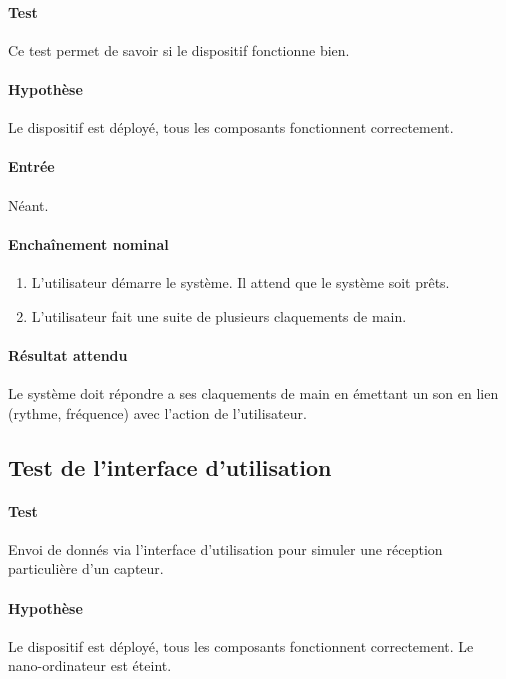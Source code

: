 \documentclass[a4paper, titlepage, oneside, 12pt]{article}%
\begin{document}
\paragraph{Test\\}
Ce test permet de savoir si le dispositif fonctionne bien.

\paragraph{Hypothèse\\}
Le dispositif est déployé, tous les composants fonctionnent correctement.

\paragraph{Entrée\\}
Néant.

\paragraph{Enchaînement nominal}
\begin {enumerate}
\item L'utilisateur démarre le système. Il attend que le système soit prêts.
\item L'utilisateur fait une suite de plusieurs claquements de main.
\end{enumerate}

\paragraph{Résultat attendu\\}
Le système doit répondre a ses claquements de main en émettant un son en lien (rythme, fréquence) avec l'action de l'utilisateur.

\subsection{Test de l'interface d'utilisation}
\paragraph{Test\\}
Envoi de donnés via l'interface d'utilisation pour simuler une réception particulière d'un capteur.

\paragraph{Hypothèse\\}
Le dispositif est déployé, tous les composants fonctionnent correctement.
Le nano-ordinateur est éteint.
\end{document}

